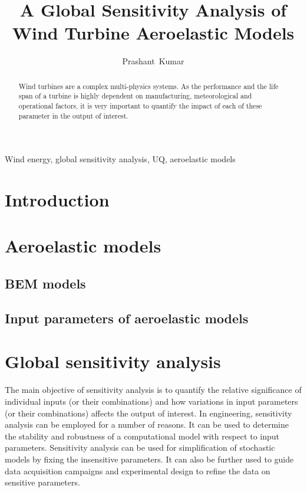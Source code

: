 \documentclass[review]{elsarticle}
\title{A Global Sensitivity Analysis of Wind Turbine Aeroelastic Models}
\numberwithin{equation}{section}
\numberwithin{equation}{section}
\begin{document}
\begin{frontmatter}
\author[]{Prashant~Kumar}
\begin{abstract}
Wind turbines are a complex multi-physics systems. As the performance and the life span of a turbine is highly dependent on  manufacturing, meteorological and operational factors, it is very important to quantify the impact of each of these parameter in the output of interest.  
\end{abstract}
\begin{keyword}
Wind energy, global sensitivity analysis, UQ, aeroelastic models 
\end{keyword}
\end{frontmatter}
\linenumbers
\section{Introduction}
\section{Aeroelastic models}
\subsection{BEM models}
\subsection{Input parameters of aeroelastic models}
\section{Global sensitivity analysis}
The main objective of sensitivity analysis is to quantify the relative significance of individual inputs (or their combinations) and how variations in input parameters (or their combinations) affects the output of interest. In engineering, sensitivity analysis can be employed for a number of reasons. It can be used to determine the stability and robustness of a computational model with respect to input parameters. Sensitivity analysis can be used for simplification of stochastic models by fixing the insensitive parameters. It can also be further used to guide data acquisition campaigns and experimental design to refine the data on sensitive parameters.
\end{document}
